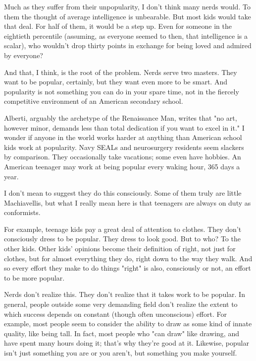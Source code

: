 Much as they
                  suffer from their unpopularity, I don't think many nerds
                  would. To them the thought of average intelligence is
                  unbearable. But most kids would take that deal. For half of
                  them, it would be a step up. Even for someone in the eightieth
                  percentile (assuming, as everyone seemed to then, that
                  intelligence is a scalar), who wouldn't drop thirty points in
                  exchange for being loved and admired by everyone?

And
                  that, I think, is the root of the problem. Nerds serve two
                  masters. They want to be popular, certainly, but they want
                  even more to be smart. And popularity is not something you can
                  do in your spare time, not in the fiercely competitive
                  environment of an American secondary school.




                  Alberti, arguably the archetype of the Renaissance Man, writes
                  that "no art, however minor, demands less than total
                  dedication if you want to excel in it." I wonder if anyone in
                  the world works harder at anything than American school kids
                  work at popularity. Navy SEALs and neurosurgery residents seem
                  slackers by comparison. They occasionally take vacations; some
                  even have hobbies. An American teenager may work at being
                  popular every waking hour, 365 days a year.

I don't
                  mean to suggest they do this consciously. Some of them truly
                  are little Machiavellis, but what I really mean here is that
                  teenagers are always on duty as conformists.

For
                  example, teenage kids pay a great deal of attention to
                  clothes. They don't consciously dress to be popular. They
                  dress to look good. But to who? To the other kids. Other kids'
                  opinions become their definition of right, not just for
                  clothes, but for almost everything they do, right down to the
                  way they walk. And so every effort they make to do things
                  "right" is also, consciously or not, an effort to be more
                  popular.

Nerds don't realize this. They don't
                  realize that it takes work to be popular. In general, people
                  outside some very demanding field don't realize the extent to
                  which success depends on constant (though often unconscious)
                  effort. For example, most people seem to consider the ability
                  to draw as some kind of innate quality, like being tall. In
                  fact, most people who "can draw" like drawing, and have spent
                  many hours doing it; that's why they're good at it. Likewise,
                  popular isn't just something you are or you aren't, but
                  something you make yourself.

